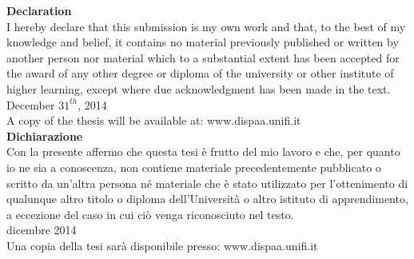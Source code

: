 
{\raggedleft\textbf{Declaration}}\\
\linebreak
{I hereby declare that this submission is my own work and that, to the best of my knowledge and belief, it contains no material previously published or written by another person nor material which to a substantial extent has been accepted for the award of any other degree or diploma of the university or other institute of higher learning, except where due acknowledgment has been made in the text.}\\
\linebreak
{\noindent December $31^{th}$, 2014 \hfill \thesisauthor}\\
\linebreak\linebreak
{\raggedleft A copy of the thesis will be available at: www.dispaa.unifi.it}\\

{\raggedleft\textbf{Dichiarazione}}\\
\linebreak
{Con la presente affermo che questa tesi è frutto del mio lavoro e che, per quanto io ne sia a conoscenza, non contiene materiale precedentemente pubblicato o scritto da un'altra persona né materiale che è stato utilizzato per l’ottenimento di qualunque altro titolo o diploma dell'Università o altro istituto di apprendimento, a eccezione del caso in cui ciò venga riconosciuto nel testo.}\\
\linebreak
{ dicembre 2014 \hfill \thesisauthor}\\
\linebreak\linebreak
{\raggedleft Una copia della tesi sarà disponibile presso: www.dispaa.unifi.it}\\

